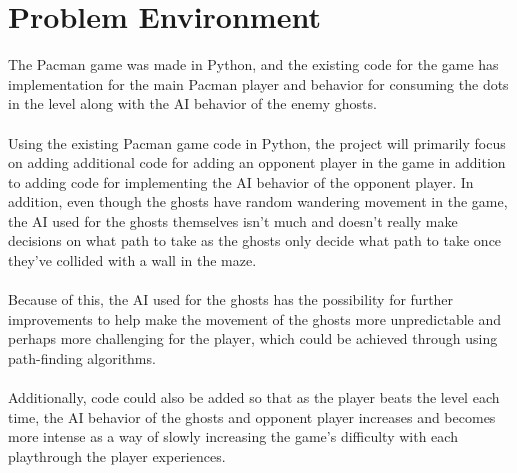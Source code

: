 \documentclass[letterpaper]{article} %
\begin{document}
\section{Problem Environment}
The Pacman game was made in Python, and the existing code for the game has implementation for the main Pacman player and behavior for consuming the dots in the level along with the AI behavior of the enemy ghosts.\\ \\ 
 Using the existing Pacman game code in Python, the project will primarily focus on adding additional code for adding an opponent player in the game in addition to adding code for implementing the AI behavior of the opponent player. In addition, even though the ghosts have random wandering movement in the game, the AI used for the ghosts themselves isn’t much and doesn’t really make decisions on what path to take as the ghosts only decide what path to take once they’ve collided with a wall in the maze. \\ \\ 
Because of this, the AI used for the ghosts has the possibility for further improvements to help make the movement of the ghosts more unpredictable and perhaps more challenging for the player, which could be achieved through using path-finding algorithms. \\ \\ 
Additionally, code could also be added so that as the player beats the level each time, the AI behavior of the ghosts and opponent player increases and becomes more intense as a way of slowly increasing the game’s difficulty with each playthrough the player experiences.
\end{document}
